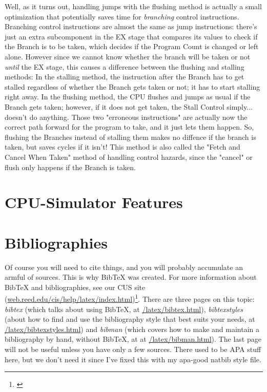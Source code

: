 \documentclass[12pt,twoside]{reedthesis}
\begin{document}
Well, as it turns out, handling jumps  with the flushing method is actually a small optimization that potentially saves time for \textit{branching} control instructions. Branching control instructions are almost the same as jump instructions: there's just an extra subcomponent in the EX stage that compares its values to check if the Branch is to be taken, which decides if the Program Count is changed or left alone. However since we cannot know whether the branch will be taken or not \textit{until} the EX stage, this causes a difference between the flushing and stalling methods: In the stalling method, the instruction after the Branch has to get stalled regardless of whether the Branch gets taken or not; it has to start stalling right away. In the flushing method, the CPU flushes and jumps as usual if the Branch gets taken; however, if it does not get taken, the Stall Control simply... doesn't do anything. Those two "erroneous instructions" are actually now the correct path forward for the program to take, and it just lets them happen. So, flushing the Branches instead of stalling them makes no diffence if the branch is taken, but saves cycles if it isn't! This method is also called the "Fetch and Cancel When Taken" method of handling control hazards, since the "cancel" or flush only happens if the Branch is taken.

\section{CPU-Simulator Features}



\section{Bibliographies}
Of course you will need to cite things, and you will probably accumulate an armful of sources. This is why BibTeX was created. For more information about BibTeX and bibliographies, see our CUS site (\url{web.reed.edu/cis/help/latex/index.html})\footnote{\cite{reedweb:2007}}. There are three pages on this topic: {\it bibtex} (which talks about using BibTeX, at \url{/latex/bibtex.html}), {\it bibtexstyles} (about how to find and use the bibliography style that best suits your needs, at \url{/latex/bibtexstyles.html}) and {\it bibman} (which covers how to make and maintain a bibliography by hand, without BibTeX, at at \url{/latex/bibman.html}). The last page will not be useful unless you have only a few sources. There used to be APA stuff here, but we don't need it since I've fixed this with my apa-good natbib style file.
\end{document}
